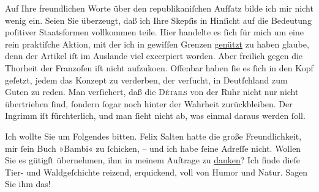 \pstart
           Auf Ihre freundlichen Worte über den republikaniſchen Aufſatz bilde ich mir nicht wenig ein. Seien Sie überzeugt,
               daß ich Ihre Skepſis in Hinſicht auf die Bedeutung poſitiver Staatsformen vollkommen
               teile. Hier handelte es{ }ſich für mich um eine rein praktiſche Aktion, mit der ich in
               gewiſſen Grenzen \uline{genützt} zu haben glaube, denn der
                  Artikel iſt im Auslande
               viel excerpiert worden. Aber freilich gegen die Thorheit der Franzoſen iſt nicht aufzuko{\geminationm}en.
               Offenbar haben{ }ſie es{ }ſich in den Kopf geſetzt, jedem das Konzept zu verderben, der
               verſucht, in Deutſchland zum Guten zu reden. Man
               verſichert, daß die \textsc{Détails} von der Ruhr nicht nur nicht übertrieben{ }ſind,{ }ſon{\pb}dern{ }ſogar noch hinter der Wahrheit
               zurückbleiben. Der Ingrimm iſt fürchterlich, und man{ }ſieht nicht ab, was einmal
               daraus werden{ }ſoll.\pend
           
\pstart
           Ich wollte Sie um Folgendes bitten. Felix
                  Salten hatte die große Freundlichkeit, mir{ }ſein Buch »Bambi« zu{ }ſchicken, – und ich habe{ }ſeine Adreſſe nicht. Wollen
               Sie es gütigſt übernehmen, ihm in meinem Auftrage zu \uline{danken}? Ich finde dieſe Tier- und Waldgeſchichte reizend, erquickend, voll
               von Humor und Natur. Sagen Sie ihm das!\pend
           
